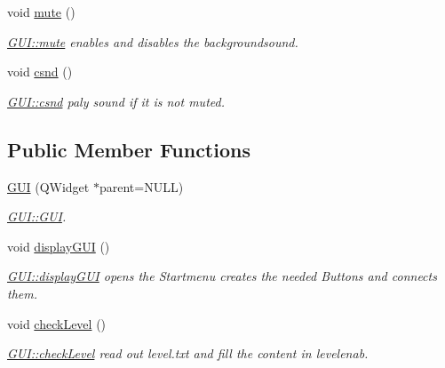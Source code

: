 \begin{DoxyCompactItemize}
void \hyperlink{class_g_u_i_a8d3a63c2c3c112592bd7642da43b837b}{mute} ()
\begin{DoxyCompactList}\small\item\em \hyperlink{class_g_u_i_a8d3a63c2c3c112592bd7642da43b837b}{G\+U\+I\+::mute} enables and disables the backgroundsound. \end{DoxyCompactList}\item 
void \hyperlink{class_g_u_i_a4a69fe3a2286ff41bb870c4d387f5aff}{csnd} ()
\begin{DoxyCompactList}\small\item\em \hyperlink{class_g_u_i_a4a69fe3a2286ff41bb870c4d387f5aff}{G\+U\+I\+::csnd} paly sound if it is not muted. \end{DoxyCompactList}\end{DoxyCompactItemize}
\subsection*{Public Member Functions}
\begin{DoxyCompactItemize}
\item 
\hyperlink{class_g_u_i_a9524032d755910ed7cf4834ecf39dc42}{G\+UI} (Q\+Widget $\ast$parent=N\+U\+LL)
\begin{DoxyCompactList}\small\item\em \hyperlink{class_g_u_i_a9524032d755910ed7cf4834ecf39dc42}{G\+U\+I\+::\+G\+UI}. \end{DoxyCompactList}\item 
void \hyperlink{class_g_u_i_a329ff5d6462e5491f309830b4eee25f7}{display\+G\+UI} ()
\begin{DoxyCompactList}\small\item\em \hyperlink{class_g_u_i_a329ff5d6462e5491f309830b4eee25f7}{G\+U\+I\+::display\+G\+UI} opens the Startmenu creates the needed Buttons and connects them. \end{DoxyCompactList}\item 
void \hyperlink{class_g_u_i_acf0edc3e3efe914e04e0dcb416cf29f1}{check\+Level} ()
\begin{DoxyCompactList}\small\item\em \hyperlink{class_g_u_i_acf0edc3e3efe914e04e0dcb416cf29f1}{G\+U\+I\+::check\+Level} read out level.\+txt and fill the content in levelenab. \end{DoxyCompactList}\end{DoxyCompactItemize}
